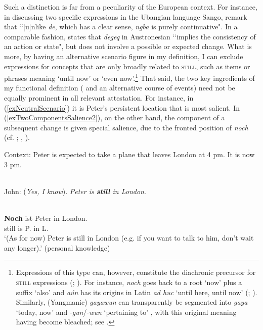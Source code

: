 Such a distinction is far from a peculiarity of the European context. For instance, in discussing two specific expressions in the Ubangian language Sango, \textcite[114]{NassensteinPasch2021} remark that \lq\lq [u]nlike \textit{de}, which has a clear  sense, \textit{ngba} is purely continuative". In a comparable fashion, \textcite[137]{Connell2013} states that \textit{degeq} in Austronesian  \lq\lq implies the consistency of an action or state", but does not involve a possible or expected change. What is more, by having an alternative scenario figure in my definition, I can exclude expressions for concepts that are only broadly related to \textsc{still}, such as items or phrases meaning \lq until now' or  \lq even now\rq{}.\footnote{Expressions of this type can, however, constitute the diachronic precursor for \textsc{still} expressions (\cite{vanderAuwera1998}; \cite{vanBaar1997}). For instance,  \textit{noch} goes back to  a root \lq now' plus a suffix \lq also' \parencite[s.v. \textit{noch}]{DWDS} and  \textit{aún} has its origins in Latin \textit{ad huc} \lq until here, until now' (\cite{vanderAuwera1998}; \cite[s.v. \textit{aún}]{RAEDictionary}). Similarly,  (Yangmanic) \textit{gayawun} can transparently be segmented into \textit{gaya} \lq today, now' and \mbox{-\textit{gun}}/\mbox{-\textit{wun}} \lq pertaining to' \parencite[323]{Merlan1994}, with this original meaning having become bleached; see .}  That said, the two key ingredients of my functional definition ( and an alternative course of events) need not be equally prominent in all relevant attestation. For instance, in (\ref{exNeutralScenario}) it is Peter's persistent location that is most salient. In (\ref{exTwoComponentsSalience2}), on the other hand, the component of a subsequent change is given special salience, due to the fronted position of  \textit{noch} (cf. \cite{Beck2020}; \cite{Koenig1977}, \citeyear[140]{Koenig1991}).

\begin{exe}
	\ex
	\begin{xlist}
	\sn Context: Peter is expected to take a plane that leaves London at 4 pm. It is now 3 pm.
	
	\ex {}\\
	John: (\textit{Yes, I know}). \textit{Peter is \textbf{still} in London}. \parencite[32]{vanBaar1997}\label{exNeutralScenario}

	\ex \label{exTwoComponentsSalience2}
	\\
	\gll \textbf{Noch} ist Peter in London.\\
	still is P. in L.\\
	\glt \lq (As for now) Peter is still in London (e.g. if you want to talk to him, don't wait any longer).'  (personal knowledge)
	\end{xlist}
\end{exe}
 
